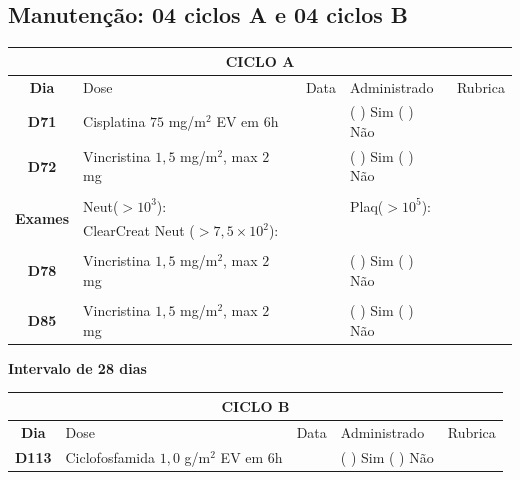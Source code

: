 \documentclass[11pt,a4paper,oldfontcommands]{memoir}
\begin{document}
\subsection{Manutenção: 04 ciclos A e 04 ciclos B}

\begin{center}
\begin{table}[H]
\begin{tabular}{p{1cm}p{6cm}|p{1cm}|p{3cm}|p{2.5cm}}
	\hline
	\multicolumn{5}{c}{\textbf{CICLO A}}\\
\hline
    \multicolumn{1}{c|}{\multirow{1}{*}{\textbf{Dia}}}&{Dose}&{Data}&{Administrado}&{Rubrica} \\
    \hline
    \multicolumn{1}{c|}{\multirow{1}{*}{\textbf{D71}}}&{Cisplatina \(75\) mg/m\(^2\) EV em 6h}&&{(  ) Sim (  ) Não}&\\
    \multicolumn{1}{c|}{\multirow{1}{*}{\textbf{D72}}}&{Vincristina \(1,5\) mg/m\(^2\), max \(2\) mg}&&{(  ) Sim (  ) Não}&\\
    \multicolumn{1}{c|}{\multirow{1}{*}{\textbf{}}}&&&&\\
    \hline
    \multicolumn{1}{c|}{\multirow{2}{*}{\textbf{Exames}}}&\multicolumn{2}{l|}{Neut(\(>10^3\)):}&{Plaq(\(>10^5\)):}&\\
    \cline{2-5}
    \multicolumn{1}{c|}{\multirow{2}{*}{{}}}&\multicolumn{2}{l|}{ClearCreat Neut (\(>7,5\times10^2\)):}&{}&{}\\
    \hline
    \\
    \hline
    \multicolumn{1}{c|}{\multirow{1}{*}{\textbf{D78}}}&{Vincristina \(1,5\) mg/m\(^2\), max \(2\) mg}&&{(  ) Sim (  ) Não}&\\
    \hline
    \\
    \hline
    \multicolumn{1}{c|}{\multirow{1}{*}{\textbf{D85}}}&{Vincristina \(1,5\) mg/m\(^2\), max \(2\) mg}&&{(  ) Sim (  ) Não}&\\
    \hline
    \end{tabular}
    \end{table}
    \textbf{Intervalo de 28 dias}
   \begin{table}[H]
    \begin{tabular}{p{1cm}p{6cm}|p{1cm}|p{3cm}|p{2.5cm}}
    \hline
	\multicolumn{5}{c}{\textbf{CICLO B}}\\
	\hline
    \multicolumn{1}{c|}{\multirow{1}{*}{\textbf{Dia}}}&{Dose}&{Data}&{Administrado}&{Rubrica} \\
    \hline
    \multicolumn{1}{c|}{\multirow{1}{*}{\textbf{D113}}}&{Ciclofosfamida \(1,0\) g/m\(^2\) EV em 6h}&&{(  ) Sim (  ) Não}&\\

\end{tabular}
\end{table}
\end{center}
\end{document}
